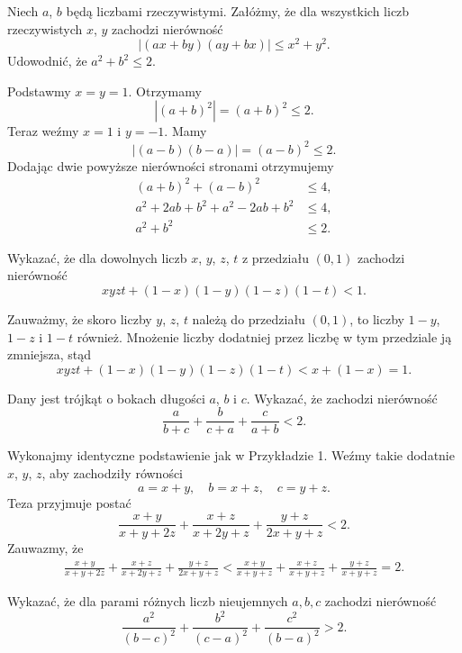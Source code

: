 \newpage
{}
\begin{problem}{1}
	Niech $a$, $b$ będą liczbami rzeczywistymi. Załóżmy, że dla wszystkich liczb rzeczywistych $x$, $y$ zachodzi nierówność
	\[
		|(ax + by)(ay + bx)| \leqslant x^2 + y^2.
	\]
	Udowodnić, że $a^2 + b^2 \leqslant 2$.
\end{problem}

\noindent
Podstawmy $x = y = 1$. Otrzymamy
\[
	|(a + b)^2| = (a + b)^2 \leqslant 2.
\]
Teraz weźmy $x = 1$ i $y = -1$. Mamy
\[
	|(a - b)(b - a)| = (a - b)^2 \leqslant 2.
\]
Dodając dwie powyższe nierówności stronami otrzymujemy
\begin{align*}
	(a + b)^2 + (a - b)^2 &\leqslant 4, \\
	a^2 + 2ab + b^2 + a^2 - 2ab + b^2 &\leqslant 4, \\
	a^2 + b^2 &\leqslant 2.
\end{align*}

\begin{problem}{2}
Wykazać, że dla dowolnych liczb $x$, $y$, $z$, $t$ z przedziału $(0, 1)$ zachodzi nierówność
\[
	xyzt + (1 - x)(1 - y)(1 - z)(1 - t) < 1.
\]
\end{problem}

\noindent
Zauważmy, że skoro liczby $y$, $z$, $t$ należą do przedziału $(0, 1)$, to liczby $1 - y$, $1 - z$ i $1 - t$ również. Mnożenie liczby dodatniej przez liczbę w tym przedziale ją zmniejsza, stąd
\[
	xyzt + (1 - x)(1 - y)(1 - z)(1 - t) < x + (1 - x) = 1.
\]

\begin{problem}{3}
Dany jest trójkąt o bokach długości $a$, $b$ i $c$. Wykazać, że zachodzi nierówność
\[
	\frac{a}{b + c} + \frac{b}{c + a} + \frac{c}{a + b} < 2.
\]
\end{problem}

\noindent
Wykonajmy identyczne podstawienie jak w Przykładzie 1. Weźmy takie dodatnie $x$, $y$, $z$, aby zachodziły równości
\[
	a = x + y, \quad b = x + z, \quad c = y + z.
\]
Teza przyjmuje postać
\[
	\frac{x + y}{x + y + 2z} + \frac{x + z}{x + 2y + z} + \frac{y + z}{2x + y + z} < 2.
\]
Zauwazmy, że
\begin{align*}
	\frac{x + y}{x + y + 2z} + \frac{x + z}{x + 2y + z} + \frac{y + z}{2x + y + z} < \frac{x + y}{x + y + z} + \frac{x + z}{x + y + z} + \frac{y + z}{x + y + z} = 2.
\end{align*}

\begin{problem}{4}
Wykazać, że dla parami różnych liczb nieujemnych $a,b,c$ zachodzi nierówność
\[
	\frac{a^2}{(b - c)^2} + \frac{b^2}{(c - a)^2} + \frac{c^2}{(b - a)^2} > 2.
\]
\end{problem}

